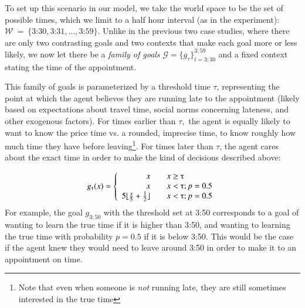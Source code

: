 \documentclass[12pt, floatsintext, jou]{apa6}
\begin{document}
To set up this scenario in our model, we take the world space to be the set of possible times, which we limit to a half hour interval (as in the experiment): $\mathcal{W}~=~\{\textrm{3:30}, \textrm{3:31}, \dots, \textrm{3:59}\}$. Unlike in the previous two case studies, where there are only two contrasting goals  and two contexts that make each goal more or less likely, we now let there be a \emph{family of goals} $\mathcal{G} = \{g_\tau\}_{t=3:30}^{3:59}$ and a fixed context stating the time of the appointment. 

This family of goals is parameterized by a threshold time $\tau$, representing the point at which the agent believes they are running late to the appointment (likely based on expectations about travel time, social norms concerning lateness, and other exogenous factors). For times earlier than $\tau,$ the agent is equally likely to want to know the price time vs. a rounded, imprecise time, to know roughly how much time they have before leaving\footnote{Note that even when someone is \emph{not} running late, they are still sometimes interested in the true time}. For times later than $\tau$, the agent cares about the exact time in order to make the kind of decisions described above:

\DeclarePairedDelimiter{\floor}{\lfloor}{\rfloor}

$$g_\tau(x) = \left\{
\begin{array}{rcl}
x & & x \ge \tau\\
x & & x < \tau; p = 0.5 \\
5\floor{\frac{x}{5} + \frac{1}{2}}  & & x < \tau; p = 0.5
\end{array}
\right.
$$
For example, the goal $g_{3:50}$ with the threshold set at 3:50 corresponds to a goal of wanting to learn the true time if it is higher than 3:50, and wanting to learning the true time with probability $p = 0.5$ if it is below 3:50. This would be the case if the agent knew they would need to leave around 3:50 in order to make it to an appointment on time.
\end{document}
